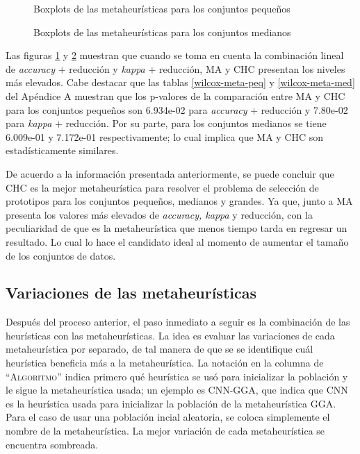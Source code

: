 \begin{figure}[h!]

	\centering

\caption{Boxplots de las metaheurísticas para los conjuntos pequeños}
\label{small-heuristics}
\end{figure}

\begin{figure}[h!]

	\centering

\caption{Boxplots de las metaheurísticas para los conjuntos medianos}
\label{medium-heuristics}
\end{figure}

Las figuras \ref{small-heuristics} y \ref{medium-heuristics} muestran que cuando se toma en cuenta la combinación lineal de \emph{accuracy} + reducción y \emph{kappa} + reducción, MA y CHC presentan los niveles más elevados. Cabe destacar que las tablas \ref{wilcox-meta-peq} y \ref{wilcox-meta-med} del Apéndice A muestran que los p-valores de la comparación entre MA y CHC para los conjuntos pequeños son 6.934e-02 para \emph{accuracy} + reducción y  7.80e-02 para \emph{kappa} + reducción. Por su parte, para los conjuntos medianos se tiene 6.009e-01 y 7.172e-01 respectivamente; lo cual implica que MA y CHC son estadísticamente similares. 

De acuerdo a la información presentada anteriormente, se puede concluir que CHC es la mejor metaheurística para resolver el problema de selección de prototipos para los conjuntos pequeños, medianos y grandes. Ya que, junto a MA presenta los valores más elevados de \emph{accuracy, kappa} y reducción, con la peculiaridad de que es la metaheurística que menos tiempo tarda en regresar un resultado. Lo cual lo hace el candidato ideal al momento de aumentar el tamaño de los conjuntos de datos.  



\subsection{Variaciones de las metaheurísticas}

Después del proceso anterior, el paso inmediato a seguir es la combinación de las heurísticas con las metaheurísticas. La idea es evaluar las variaciones de cada metaheurística por separado, de tal manera de que se se identifique cuál heurística beneficia más a la metaheurística. La notación en la columna de ``\textsc{Algoritmo}'' indica primero qué heurística se usó para inicializar la población y le sigue la metaheurística usada; un ejemplo es CNN-GGA, que indica que CNN es la heurística usada para inicializar la población de la metaheurística GGA. Para el caso de usar una población incial aleatoria, se coloca simplemente el nombre de la metaheurística. La mejor variación de cada metaheurística se encuentra sombreada.


